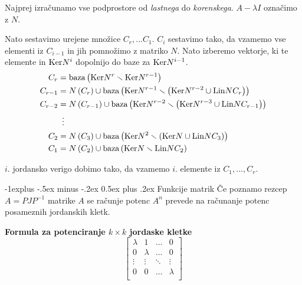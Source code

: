 \documentclass[a4paper,landscape]{article}
\makeatletter
\renewcommand{\subsection}{\@startsection{subsection}{2}{0mm}%
                                {-1explus -.5ex minus -.2ex}%
                                {0.5ex plus .2ex}%
                                {\normalfont\normalsize\bfseries}}
\makeatother
\begin{document}
\begin{multicols}{3}
Najprej izračunamo vse podprostore od \emph{lastnega} do \emph{korenskega}. $A-\lambda I$ označimo z $N$.

Nato sestavimo urejene množice $C_r, ... C_1$. $C_i$ sestavimo tako, da vzamemo vse elementi iz $C_{i-1}$ in jih pomnožimo z matriko $N$. Nato izberemo vektorje, ki te elemente in $\textmd{Ker}N^i$ dopolnijo do baze za $\textmd{Ker}N^{i-1}$.
\begin{equation*}
    \begin{aligned}
        C_r &= \textmd{baza}\left( \textmd{Ker}N^{r} \smallsetminus \textmd{Ker}N^{r-1}\right) \\
        C_{r-1} &= N\left( C_{r}\right) \cup \textmd{baza} \left( \textmd{Ker}N^{r-1} \smallsetminus \left( \textmd{Ker}N^{r-2} \cup \textmd{Lin} N C_r \right) \right) \\
        C_{r-2} &= N\left( C_{r-1}\right) \cup \textmd{baza}\left( \textmd{Ker}N^{r-2} \smallsetminus \left( \textmd{Ker}N^{r-3} \cup \textmd{Lin}NC_{r-1} \right) \right) \\
        & \, \ \vdots \\
        C_{2} &= N\left( C_{3}\right) \cup \textmd{baza}\left( \textmd{Ker}N^{2} \smallsetminus \left( \textmd{Ker}N \cup \textmd{Lin}NC_{3} \right) \right) \\
        C_{1} &= N\left( C_{2}\right) \cup \textmd{baza}\left( \textmd{Ker}N \smallsetminus \textmd{Lin} NC_{2} \right) \\
    \end{aligned}
\end{equation*}

$i$. jordansko verigo dobimo tako, da vzamemo $i$. elemente iz $C_1, ..., C_r$.


\subsection{Funkcije matrik}
Če poznamo rezcep $A = PJP^{-1}$ matrike $A$ se računje potenc $A^n$ prevede na računanje potenc posameznih jordanskih kletk.

\textbf{Formula za potenciranje $k \times k$ jordaske kletke}
\[
    \begin{bmatrix}
        \lambda & 1   & \dots & 0 \\
        0 & \lambda & \dots & 0 \\
        \vdots & \vdots & \ddots & \vdots \\
        0 & 0 & \dots & \lambda \\


\end{bmatrix}\]
\end{multicols}
\end{document}
